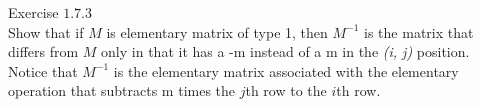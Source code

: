 \documentclass[12pt]{article}
\begin{document}
Exercise $1.7.3$\\

Show that if $M$ is elementary matrix of type 1, then $M^{-1}$ is the matrix that differs from $M$ only in that it has a -m instead of a m in the \textit{(i, j)} position. Notice that $M^{-1}$ is the elementary matrix associated with the elementary operation that subtracts m times the $j$th row to the $i$th row.
\end{document}
